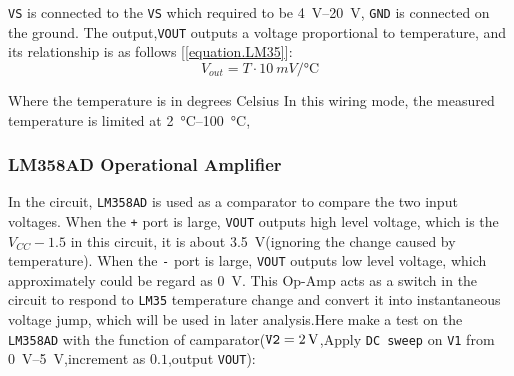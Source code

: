 \documentclass[12pt]{article}
\numberwithin{equation}{section}
\begin{document}
\verb|VS| is connected to the \verb|VS| which required to be \qtyrange{4}{20}{V}, \verb|GND| is connected on the ground. The output,\verb|VOUT| outputs a voltage proportional to temperature, and its relationship is as follows [\ref{equation.LM35}]\cite{LM35}:
\begin{equation}
	V_{out}=T \cdot \qty{10}{mV \per \degreeCelsius}  \label{equation.LM35}
\end{equation}

Where the temperature is in degrees Celsius In this wiring mode, the measured temperature is limited at \qtyrange{2}{100}{\degreeCelsius},


\subsubsection{LM358AD Operational Amplifier \cite{LM358AD}}
In the circuit, \verb|LM358AD| is used as a comparator to compare the two input voltages. When the \verb|+| port is large, \verb|VOUT| outputs high level voltage, which is the $V_ {CC} - \num{1.5}$ in this circuit, it is about \qty{3.5}{V}(ignoring the change caused by temperature)\cite{LM358AD}. When the \verb|-| port is large, \verb|VOUT| outputs low level voltage, which approximately could be regard as \qty{0}{V}. This Op-Amp acts as a switch in the circuit to respond to \verb|LM35| temperature change and convert it into instantaneous voltage jump, which will be used in later analysis.Here make a test on the \verb|LM358AD| with the function of camparator($\verb|V2|=\qty{2}{V}$,Apply \verb|DC sweep| on \verb|V1| from \qtyrange{0}{5}{V},increment as $0.1$,output \verb|VOUT|):
\end{document}
